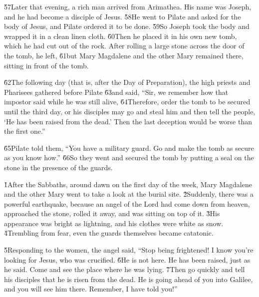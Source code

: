 \v{57}Later that evening, a rich man arrived from Arimathea. His name was Joseph, and he had become a disciple of Jesus. \v{58}He went to Pilate and asked for the body of Jesus, and Pilate ordered it to be done. \v{59}So Joseph took the body and wrapped it in a clean linen cloth. \v{60}Then he placed it in his own new tomb, which he had cut out of the rock. After rolling a large stone across the door of the tomb, he left, \v{61}but Mary Magdalene and the other Mary remained there, sitting in front of the tomb.

\v{62}The following day (that is, after the Day of Preparation), the high priests and Pharisees gathered before Pilate \v{63}and said, ``Sir, we remember how that impostor said while he was still alive,  \v{64}Therefore, order the tomb to be secured until the third day, or his disciples may go and steal him and then tell the people, `He has been raised from the dead.' Then the last deception would be worse than the first one.''

\v{65}Pilate told them, ``You have a military guard. Go and make the tomb as secure as you know how.'' \v{66}So they went and secured the tomb by putting a seal on the stone in the presence of the guards.

\v{1}After the Sabbaths, around dawn on the first day of the week, Mary Magdalene and the other Mary went to take a look at the burial site. \v{2}Suddenly, there was a powerful earthquake, because an angel of the Lord had come down from heaven, approached the stone, rolled it away, and was sitting on top of it. \v{3}His appearance was bright as lightning, and his clothes were white as snow. \v{4}Trembling from fear, even the guards themselves became catatonic.

\v{5}Responding to the women, the angel said, ``Stop being frightened! I know you're looking for Jesus, who was crucified. \v{6}He is not here. He has been raised, just as he said. Come and see the place where he was lying. \v{7}Then go quickly and tell his disciples that he is risen from the dead. He is going ahead of you into Galilee, and you will see him there. Remember, I have told you!''

